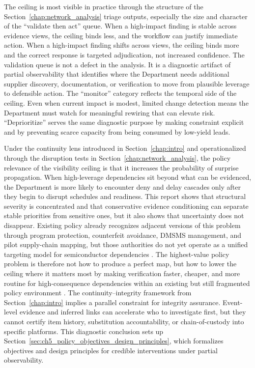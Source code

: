 The ceiling is most visible in practice through the structure of the Section~\ref{chap:network_analysis} triage outputs, especially the size and character of the ``validate then act'' queue. When a high-impact finding is stable across evidence views, the ceiling binds less, and the workflow can justify immediate action. When a high-impact finding shifts across views, the ceiling binds more and the correct response is targeted adjudication, not increased confidence. The validation queue is not a defect in the analysis. It is a diagnostic artifact of partial observability that identifies where the Department needs additional supplier discovery, documentation, or verification to move from plausible leverage to defensible action. The ``monitor'' category reflects the temporal side of the ceiling. Even when current impact is modest, limited change detection means the Department must watch for meaningful rewiring that can elevate risk. ``Deprioritize'' serves the same diagnostic purpose by making constraint explicit and by preventing scarce capacity from being consumed by low-yield leads.

Under the continuity lens introduced in Section~\ref{chap:intro} and operationalized through the disruption tests in Section~\ref{chap:network_analysis}, the policy relevance of the visibility ceiling is that it increases the probability of surprise propagation. When high-leverage dependencies sit beyond what can be evidenced, the Department is more likely to encounter deny and delay cascades only after they begin to disrupt schedules and readiness. This report shows that structural severity is concentrated and that conservative evidence conditioning can separate stable priorities from sensitive ones, but it also shows that uncertainty does not disappear. Existing policy already recognizes adjacent versions of this problem through program protection, counterfeit avoidance, DMSMS management, and pilot supply-chain mapping, but those authorities do not yet operate as a unified targeting model for semiconductor dependencies \parencite{ch5_dodi520044,ch5_dodi424515,ch5_dfars2522467007,ch5_dfars2522467008,ch5_ndaa2024_sec856}. The highest-value policy problem is therefore not how to produce a perfect map, but how to lower the ceiling where it matters most by making verification faster, cheaper, and more routine for high-consequence dependencies within an existing but still fragmented policy environment \parencite{ch5_dod2022_supplychains,U.S.GovernmentAccountabilityOffice2025}. The continuity--integrity framework from Section~\ref{chap:intro} implies a parallel constraint for integrity assurance. Event-level evidence and inferred links can accelerate who to investigate first, but they cannot certify item history, substitution accountability, or chain-of-custody into specific platforms. This diagnostic conclusion sets up Section~\ref{sec:ch5_policy_objectives_design_principles}, which formalizes objectives and design principles for credible interventions under partial observability.

